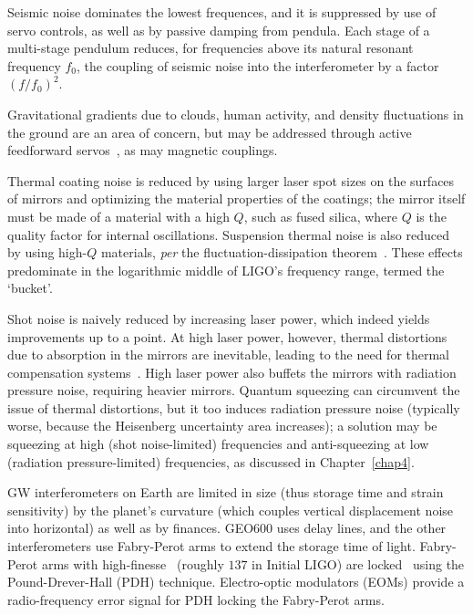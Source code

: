 Seismic noise dominates the lowest frequences, and it is suppressed by use of servo controls, as well as by passive damping from pendula.
Each stage of a multi-stage pendulum reduces, for frequencies above its natural resonant frequency $f_0$, the coupling of seismic noise into the interferometer by a factor $(f/f_0)^2$.

Gravitational gradients due to clouds, human activity, and density fluctuations in the ground are an area of concern, but may be addressed through active feedforward servos~\cite{Driggers2012ActiveNoise}, as may magnetic couplings.

Thermal coating noise is reduced by using larger laser spot sizes on the surfaces of mirrors and optimizing the material properties of the coatings; the mirror itself must be made of a material with a high $Q$, such as fused silica, where $Q$ is the quality factor for internal oscillations.
Suspension thermal noise is also reduced by using high-$Q$ materials, \textit{per} the fluctuation-dissipation theorem~\cite{Saulson}.
These effects predominate in the logarithmic middle of LIGO's frequency range, termed the `bucket'.

Shot noise is naively reduced by increasing laser power, which indeed yields improvements up to a point.
At high laser power, however, thermal distortions due to absorption in the mirrors are inevitable, leading to the need for thermal compensation systems~\cite{BallmerThesis}.
High laser power also buffets the mirrors with radiation pressure noise, requiring heavier mirrors.
Quantum squeezing can circumvent the issue of thermal distortions, but it too induces radiation pressure noise (typically worse, because the Heisenberg uncertainty area increases); a solution may be squeezing at high (shot noise-limited) frequencies and anti-squeezing at low (radiation pressure-limited) frequencies, as discussed in Chapter~\ref{chap4}.


GW interferometers on Earth are limited in size (thus storage time and strain sensitivity) by the planet's curvature (which couples vertical displacement noise into horizontal) as well as by finances. 
GEO600 uses delay lines, and the other interferometers use Fabry-Perot arms to extend the storage time of light.
Fabry-Perot arms with high-finesse~\cite{ResonanceFP,ResponsesFP} (roughly $137$ in Initial LIGO) are locked~\cite{PDHNotes} using the Pound-Drever-Hall (PDH) technique.
Electro-optic modulators (EOMs) provide a radio-frequency error signal for PDH locking the Fabry-Perot arms.

